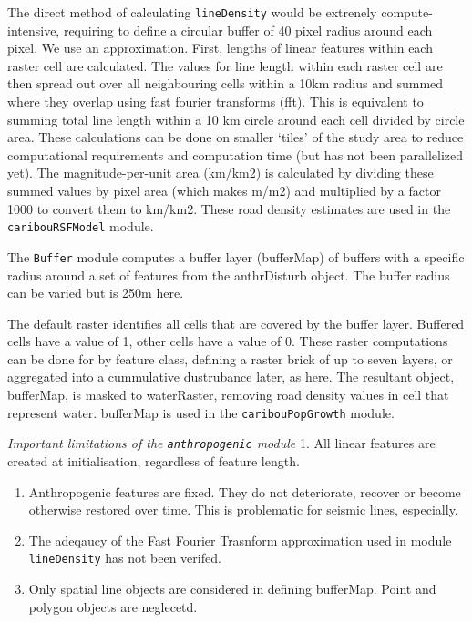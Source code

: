 \documentclass[]{article}
\begin{document}
The direct method of calculating \texttt{lineDensity} would be extrenely
compute-intensive, requiring to define a circular buffer of 40 pixel
radius around each pixel. We use an approximation. First, lengths of
linear features within each raster cell are calculated. The values for
line length within each raster cell are then spread out over all
neighbouring cells within a 10km radius and summed where they overlap
using fast fourier transforms (fft). This is equivalent to summing total
line length within a 10 km circle around each cell divided by circle
area. These calculations can be done on smaller `tiles' of the study
area to reduce computational requirements and computation time (but has
not been parallelized yet). The magnitude-per-unit area (km/km2) is
calculated by dividing these summed values by pixel area (which makes
m/m2) and multiplied by a factor 1000 to convert them to km/km2. These
road density estimates are used in the \texttt{caribouRSFModel} module.

The \texttt{Buffer} module computes a buffer layer (bufferMap) of
buffers with a specific radius around a set of features from the
anthrDisturb object. The buffer radius can be varied but is 250m here.

The default raster identifies all cells that are covered by the buffer
layer. Buffered cells have a value of 1, other cells have a value of 0.
These raster computations can be done for by feature class, defining a
raster brick of up to seven layers, or aggregated into a cummulative
dustrubance later, as here. The resultant object, bufferMap, is masked
to waterRaster, removing road density values in cell that represent
water. bufferMap is used in the \texttt{caribouPopGrowth} module.

\emph{Important limitations of the \texttt{anthropogenic} module} 1. All
linear features are created at initialisation, regardless of feature
length.

\begin{enumerate}
\def\labelenumi{\arabic{enumi}.}
\setcounter{enumi}{1}
\item
  Anthropogenic features are fixed. They do not deteriorate, recover or
  become otherwise restored over time. This is problematic for seismic
  lines, especially.
\item
  The adeqaucy of the Fast Fourier Trasnform approximation used in
  module \texttt{lineDensity} has not been verifed.
\item
  Only spatial line objects are considered in defining bufferMap. Point
  and polygon objects are neglecetd.
\end{enumerate}
\end{document}
